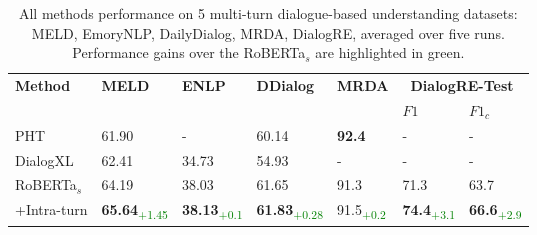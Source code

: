 \begin{table}[t]
  \centering
  \vspace{-0.35cm}
  \begin{tabular}{lllllll}
    \toprule
  \multirow{2}{*}{\textbf{Method}} &\multirow{2}{*}{\textbf{MELD}} & \multirow{2}{*}{\textbf{ENLP}} & \multirow{2}{*}{\textbf{DDialog}} & \multirow{2}{*}{\textbf{MRDA}} & \multicolumn{2}{c}{\textbf{DialogRE-Test}}      \\
    \cmidrule(l){6-7}   
      &  & & & & $F1$  & $F1_c$  \\
    \midrule
    PHT  &61.90&-&	60.14&	\textbf{92.4}&- &- \\
    DialogXL  & 62.41 & 34.73 & 54.93 & -& - & -  \\
    RoBERTa$_s$& 64.19&38.03	&61.65	&91.3	&71.3 & 63.7\\
+Intra-turn &\textbf{65.64}\textsubscript{\textcolor{green}{+1.45}}& \textbf{38.13}\textsubscript{\textcolor{green}{+0.1}} &\textbf{61.83}\textsubscript{\textcolor{green}{+0.28}}&91.5\textsubscript{\textcolor{green}{+0.2}} & \textbf{74.4}\textsubscript{\textcolor{green}{+3.1}}&\textbf{66.6}\textsubscript{\textcolor{green}{+2.9}}\\
    \bottomrule
  \end{tabular}
    \caption{All methods performance on 5 multi-turn dialogue-based understanding datasets: MELD, EmoryNLP, DailyDialog, MRDA, DialogRE, averaged over five runs. Performance gains over the RoBERTa$_s$ are highlighted in green.}
  \label{tab:exp-mtr}
  \vspace{-0.5cm}
\end{table}


